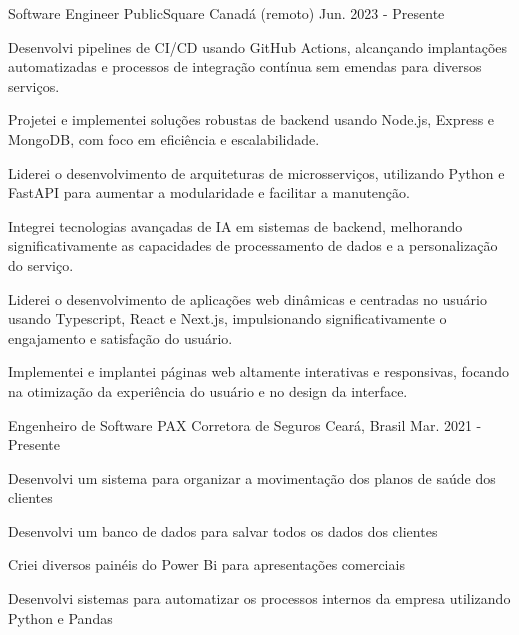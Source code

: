 

\begin{cventries}

\cventry
{Software Engineer} %
{PublicSquare} %
{Canadá (remoto)} %
{Jun. 2023 - Presente} %
{
  \begin{cvitems} %
    \item {Desenvolvi pipelines de CI/CD usando GitHub Actions, alcançando implantações automatizadas e processos de integração contínua sem emendas para diversos serviços.}
    \item {Projetei e implementei soluções robustas de backend usando Node.js, Express e MongoDB, com foco em eficiência e escalabilidade.}
    \item {Liderei o desenvolvimento de arquiteturas de microsserviços, utilizando Python e FastAPI para aumentar a modularidade e facilitar a manutenção.}
    \item {Integrei tecnologias avançadas de IA em sistemas de backend, melhorando significativamente as capacidades de processamento de dados e a personalização do serviço.}
    \item {Liderei o desenvolvimento de aplicações web dinâmicas e centradas no usuário usando Typescript, React e Next.js, impulsionando significativamente o engajamento e satisfação do usuário.}
    \item {Implementei e implantei páginas web altamente interativas e responsivas, focando na otimização da experiência do usuário e no design da interface.}
  \end{cvitems}
}



  \cventry
    {Engenheiro de Software} %
    {PAX Corretora de
    Seguros} %
    {Ceará, Brasil} %
    {Mar. 2021 - Presente} %
    {
      \begin{cvitems} %
        \item {Desenvolvi um sistema para organizar a movimentação dos planos de saúde dos clientes}
        \item {Desenvolvi um banco de dados
        para salvar todos os dados dos clientes}
        \item {Criei diversos painéis do Power Bi para apresentações comerciais}
        \item {Desenvolvi
        sistemas para automatizar os processos internos da empresa utilizando Python e Pandas}
      \end{cvitems}
    }


\end{cventries}
